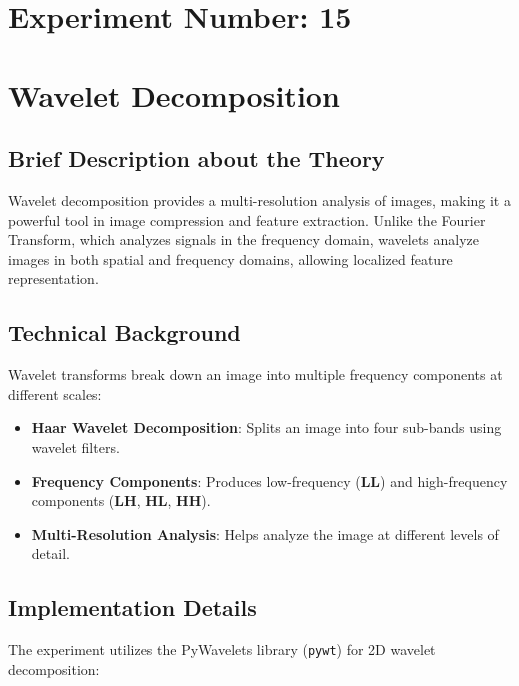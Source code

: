 \documentclass[12pt,a4paper]{article}
\begin{document}
\newpage
\section*{Experiment Number: 15}
\section{Wavelet Decomposition}

\subsection{Brief Description about the Theory}
Wavelet decomposition provides a multi-resolution analysis of images, making it a powerful tool in image compression and feature extraction. Unlike the Fourier Transform, which analyzes signals in the frequency domain, wavelets analyze images in both spatial and frequency domains, allowing localized feature representation.

\subsection{Technical Background}
Wavelet transforms break down an image into multiple frequency components at different scales:
\begin{itemize}
  \item \textbf{Haar Wavelet Decomposition}: Splits an image into four sub-bands using wavelet filters.
  \item \textbf{Frequency Components}: Produces low-frequency (\textbf{LL}) and high-frequency components (\textbf{LH}, \textbf{HL}, \textbf{HH}).
  \item \textbf{Multi-Resolution Analysis}: Helps analyze the image at different levels of detail.
\end{itemize}

\subsection{Implementation Details}
The experiment utilizes the PyWavelets library (\texttt{pywt}) for 2D wavelet decomposition:
\end{document}
